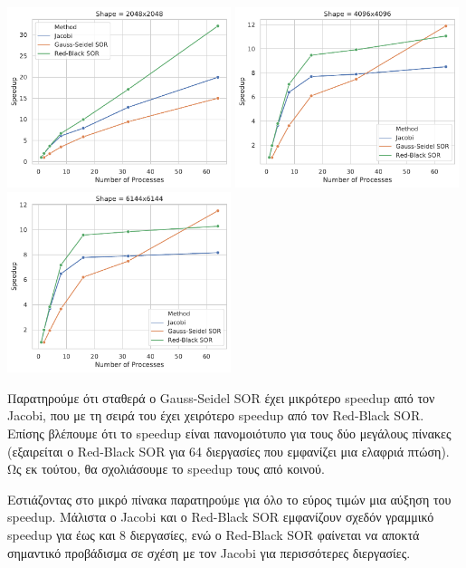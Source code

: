 \documentclass[12pt,titlepage]{article}
\begin{document}
\begin{center}
    \includegraphics[width=0.49\textwidth]{speedup-2048x2048.pdf}
    \includegraphics[width=0.49\textwidth]{speedup-4096x4096.pdf}
    \includegraphics[width=0.49\textwidth]{speedup-6144x6144.pdf}
\end{center}

Παρατηρούμε ότι σταθερά ο Gauss-Seidel SOR έχει μικρότερο speedup από τον
Jacobi, που με τη σειρά του έχει χειρότερο speedup από τον Red-Black SOR.
Επίσης βλέπουμε ότι το speedup είναι πανομοιότυπο για τους δύο μεγάλους πίνακες
(εξαιρείται ο Red-Black SOR για 64 διεργασίες που εμφανίζει μια ελαφριά πτώση).
Ως εκ τούτου, θα σχολιάσουμε το speedup τους από κοινού.

Εστιάζοντας στο μικρό πίνακα παρατηρούμε για όλο το εύρος τιμών μια αύξηση του
speedup. Μάλιστα ο Jacobi και ο Red-Black SOR εμφανίζουν σχεδόν γραμμικό speedup
για έως και 8 διεργασίες, ενώ ο Red-Black SOR φαίνεται να αποκτά σημαντικό
προβάδισμα σε σχέση με τον Jacobi για περισσότερες διεργασίες.
\end{document}
